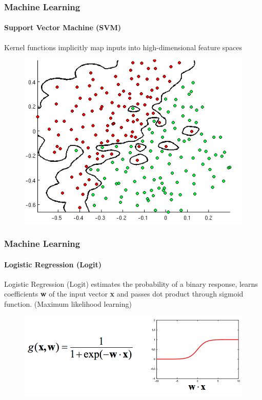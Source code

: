 \documentclass{beamer}
\begin{document}
\begin{frame}
    \frametitle{Machine Learning}
    \framesubtitle{Support Vector Machine (SVM)}
    \par Kernel functions implicitly map inputs into high-dimensional feature spaces
    \begin{figure}[!htb]
        \centering
    \includegraphics[width=0.8\columnwidth]{fig/RBFSVM2}
        \label{fig:RBFSVM2}
    \end{figure}
\end{frame}
\begin{frame}
    \frametitle{Machine Learning}
    \framesubtitle{Logistic Regression (Logit)}
        \par Logistic Regression (Logit) estimates the probability of a binary response,
    learns coefficients \textbf{w} of the input vector \textbf{x} and passes dot product through sigmoid function. (Maximum likelihood learning)
         \begin{figure}[!htb]
        \centering
    \includegraphics[width=1.0\columnwidth]{fig/logit1}
        \label{fig:logit1}
    \end{figure}
\end{frame}
\end{document}
